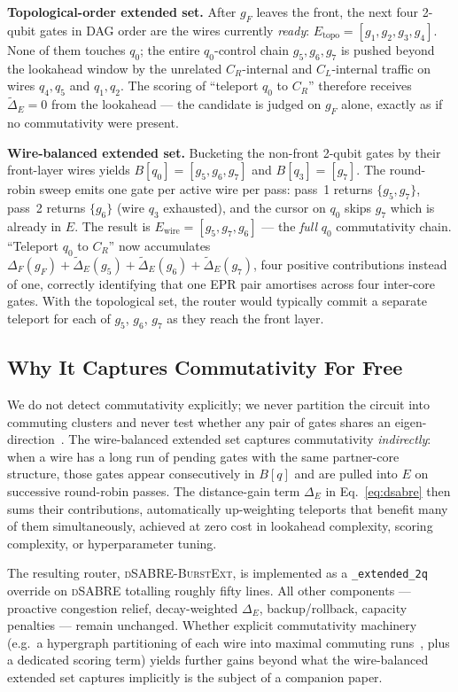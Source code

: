 \documentclass[conference]{IEEEtran}
\newcommand{\dSABRE}{\textsc{dSABRE}}
\newcommand{\BurstExt}{\textsc{dSABRE-BurstExt}}
\begin{document}
\textbf{Topological-order extended set.}
After $g_F$ leaves the front, the next four 2-qubit gates in DAG order
are the wires currently \emph{ready}:
$E_{\mathrm{topo}} = [g_1, g_2, g_3, g_4]$.
None of them touches $q_0$; the entire $q_0$-control chain
$g_5,g_6,g_7$ is pushed beyond the lookahead window by the
unrelated $C_R$-internal and $C_L$-internal traffic on wires $q_4,q_5$
and $q_1,q_2$.
The scoring of ``teleport $q_0$ to $C_R$'' therefore receives
$\tilde{\Delta}_E = 0$ from the lookahead --- the candidate is judged on
$g_F$ alone, exactly as if no commutativity were present.

\textbf{Wire-balanced extended set.}
Bucketing the non-front 2-qubit gates by their front-layer wires yields
$B[q_0] = [g_5, g_6, g_7]$ and $B[q_3] = [g_7]$.
The round-robin sweep emits one gate per active wire per pass:
pass~1 returns $\{g_5, g_7\}$, pass~2 returns $\{g_6\}$ (wire $q_3$
exhausted), and the cursor on $q_0$ skips $g_7$ which is already in $E$.
The result is
$E_{\mathrm{wire}} = [g_5, g_7, g_6]$ --- the \emph{full} $q_0$
commutativity chain.
``Teleport $q_0$ to $C_R$'' now accumulates
$\Delta_F(g_F) + \tilde{\Delta}_E(g_5) + \tilde{\Delta}_E(g_6) +
 \tilde{\Delta}_E(g_7)$, four positive contributions instead of one,
correctly identifying that one EPR pair amortises across four
inter-core gates.
With the topological set, the router would typically commit a separate
teleport for each of $g_5$, $g_6$, $g_7$ as they reach the front layer.

\subsection{Why It Captures Commutativity For Free}

We do not detect commutativity explicitly; we never partition the circuit
into commuting clusters and never test whether any pair of gates shares an
eigen-direction~\cite{hong2024commutativity}.
The wire-balanced extended set captures commutativity \emph{indirectly}:
when a wire has a long run of pending gates with the same partner-core
structure, those gates appear consecutively in $B[q]$ and are pulled into
$E$ on successive round-robin passes.
The distance-gain term $\Delta_E$ in Eq.~\ref{eq:dsabre} then sums their
contributions, automatically up-weighting teleports that benefit many of
them simultaneously, achieved at zero cost in lookahead complexity, scoring
complexity, or hyperparameter tuning.

The resulting router, \BurstExt{}, is implemented as a \texttt{\_extended\_2q}
override on \dSABRE{} totalling roughly fifty lines.
All other components --- proactive congestion relief, decay-weighted
$\Delta_E$, backup/rollback, capacity penalties --- remain unchanged.
Whether explicit commutativity machinery (e.g.\ a hypergraph partitioning
of each wire into maximal commuting runs~\cite{hong2024commutativity},
plus a dedicated scoring term) yields further gains beyond what the
wire-balanced extended set captures implicitly is the subject of a
companion paper.
\end{document}
